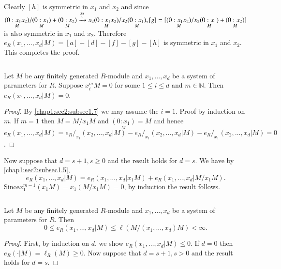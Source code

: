 Clearly $[h]$ is symmetric in $x_1$ and $x_2$ and since
$\underset{M}{(0:x_1x_2)}/
\underset{M}{(0:x_1)}+\underset{M}{(0:x_2)} \xrightarrow{\underset{\sim}{x_2}}
x_2 \underset{M}{(0:x_1x_2)}/x_2 \underset{M}{(0:x_1)}, [g]=
[\underset{M}{(0:x_1x_2)}/x_2 \underset{M}{(0:x_1)}\break +
  \underset{M}{(0:x_2)}]$ 
is also symmetric in $x_1$ and $x_2$. Therefore $e_R(x_1, \ldots,
x_d|M)= [a] + [d] - [f] - [g] - [h] $ is symmetric in $x_1$ and
$x_2$. This completes the proof. 

\setcounter{subsection}{7}
\subsection{}\label{chap1:sec2:subsec1.8}

 Let $M$ be any finitely generated $R$-module and $x_1, \ldots,
   x_d$ be a system of parameters for $R$. Suppose $x^m_i M=0$ for
   some $1 \leq i \leq d$ and $m \in \mathds{N}$. Then $e_R(x_1,
   \ldots,  x_d |M)=0$. 

\begin{proof}
  By \ref{chap1:sec2:subsec1.7} we may assume the $i=1$. Proof by induction on $m$. If
  $m=1$ then $M=M/x_1 M$ and $\underset{M}{(0:x_1)}=M$ and hence
  $e_R(x_1, \ldots,  x_d |M)= e_R/_{x_1} (x_2,  \ldots,  x_d |M)- e_R/
  _{x_1}(x_2, \ldots, x_d |M)-e_R/_{x_1} (x_2, \ldots,  x_d |M)=0$.  
\end{proof}

Now suppose that $d=s+1, s \geq 0$ and the result holds for $d=s$. We
have by \ref{chap1:sec2:subsec1.5}, 
$$
e_R(x_1, \ldots,  x_d|M)= e_R(x_1, \ldots,  x_d |x_1M) +e_R(x_1,
\ldots, x_d|M/ x_1 M). 
$$
Since\pageoriginale $x_1^{m-1}(x_1M)= x_1(M/x_1 M)=0$, by induction
the result follows. 

\setcounter{subsection}{8}
\subsection{}\label{chap1:sec2:subsec1.9}

 Let $M$ be any finitely generated $R$-module and $x_1, \ldots,
   x_d$ be a system of parameters for $R$. Then 
 $$
 0 \leq e_R(x_1, \ldots,  x_d|M) \leq \ell (M/ (x_1, \ldots,  x_d )M) < \infty.
 $$
\begin{proof}
  First, by induction on $d$, we show $e_R(x_1, \ldots,  x_d|M) \leq
  0$. If $d=0$ then $e_R(\cdot|M)= \ell_R(M) \geq 0$. Now suppose that
  $d=s+1, s > 0$ and the result holds for $d=s$. 
\end{proof}

